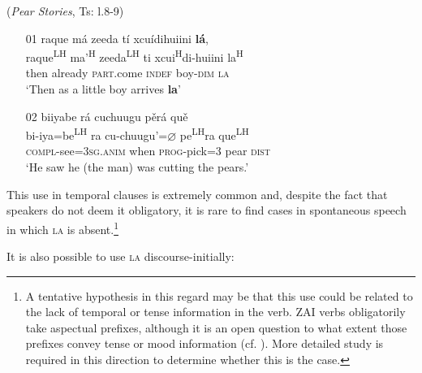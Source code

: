 \ea\label{temporal2} (\textit{Pear Stories}, Ts: l.8-9)
\begin{itemize}
\item[01]
\glll raque m\'{a} zeeda t\'{i} xcu\'{i}dihuiini \textbf{l\'{a}},  \\
raque\textsuperscript{LH} ma'\textsuperscript{H} zeeda\textsuperscript{LH} ti xcui\textsuperscript{H}di-huiini la\textsuperscript{H}  \\
then already \textsc{part}.come \textsc{indef} boy-\textsc{dim} \textsc{la}  \\
\glt `Then as a little boy arrives \textbf{la}'  


\item[02]
\glll biiyabe r\'{a} cuchuugu p\v{e}r\'{a} qu\v{e}  \\
bi-iya=be\textsuperscript{LH} ra cu-chuugu'=$\varnothing$ pe\textsuperscript{LH}ra que\textsuperscript{LH}  \\
\textsc{compl}-see=3\textsc{sg.anim} when \textsc{prog}-pick=3 pear \textsc{dist}  \\
\glt `He saw he (the man) was cutting the pears.' 

\end{itemize}
\z
This use in temporal clauses is extremely common and, despite the fact that speakers do not deem it obligatory, it is rare to find cases in spontaneous speech in which \textsc{la} is absent.\footnote{A tentative hypothesis in this regard may be that this use could be related to the lack of temporal or tense information in the verb. ZAI verbs obligatorily take aspectual prefixes, although it is an open question to what extent those prefixes convey tense or mood information (cf. ). More detailed study is required in this direction to determine whether this is the case.}

It is also possible to use \textsc{la} discourse-initially:

